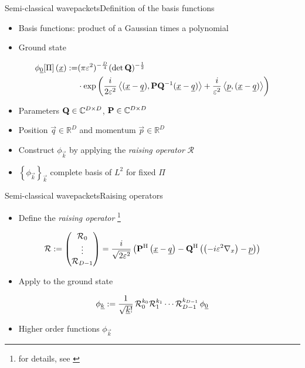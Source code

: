 \documentclass{beamer}
\begin{document}
\begin{frame}{Semi-classical wavepackets}{Definition of the basis functions}
  \begin{itemize}
  \item Basis functions: product of a Gaussian times a polynomial
  \item Ground state
  \end{itemize}
  \begin{align*}
    \phi_{\underline{0}}[\Pi]\left(\underline{x}\right)
    := &
    (\pi\varepsilon^2)^{-\frac{D}{4}} (\det\mathbf{Q})^{-\frac{1}{2}}
    \\
    & \cdot \exp \left( \frac{i}{2\varepsilon^2}
      \left\langle (\underline{x}-\underline{q}) , \mathbf{P}\mathbf{Q}{}^{-1}(\underline{x}-\underline{q}) \right\rangle
      + \frac{i}{\varepsilon^2} \left\langle \underline{p} , (\underline{x}-\underline{q}) \right\rangle
    \right)
  \end{align*}

  \begin{itemize}
  \item Parameters $\mathbf{Q} \in \mathbb{C}^{D \times D}$, $\mathbf{P} \in \mathbb{C}^{D \times D}$
  \item Position $\vec{q} \in \mathbb{R}^D$ and momentum $\vec{p} \in \mathbb{R}^D$
  \item Construct $\phi_\vec{k}$ by applying the \emph{raising operator} $\mathcal{R}$
  \item $\left\{\phi_{\vec{k}}\right\}_{\vec{k}}$ complete basis of $L^2$ for fixed $\Pi$
  \end{itemize}
\end{frame}


\begin{frame}{Semi-classical wavepackets}{Raising operators}
  \begin{itemize}
  \item Define the \emph{raising operator} \footnote{for details, see \cite{H_ladder_operators}}
  \end{itemize}
  \begin{equation*}
    \mathcal{R} :=
    \begin{pmatrix}
      \mathcal{R}_0 \\
      \vdots \\
      \mathcal{R}_{D-1}
    \end{pmatrix}
    =
    \frac{i}{\sqrt{2\varepsilon^2}} \left( \mathbf{P}{}^{\textnormal{H}} \left(\underline{x}-\underline{q}\right) - \mathbf{Q}{}^{\textnormal{H}} \left(\left(-i \varepsilon^2 \nabla_x\right)-\underline{p}\right) \right)
  \end{equation*}
  \begin{itemize}
  \item Apply to the ground state
  \end{itemize}
  \begin{equation*}
    \phi_{\underline{k}} := \frac{1}{\sqrt{\underline{k}!}} \, \mathcal{R}_0^{k_0} \mathcal{R}_1^{k_1} \cdots \mathcal{R}_{D-1}^{k_{D-1}} \, \phi_{\underline{0}}
  \end{equation*}
  \begin{itemize}
  \item Higher order functions $\phi_{\vec{k}}$
  \end{itemize}
\end{frame}
\end{document}
